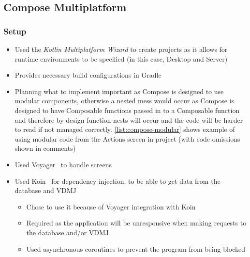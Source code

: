 \documentclass[../dissertation.tex]{subfiles}
\begin{document}
\subsection{Compose Multiplatform}
\subsubsection{Setup}
\begin{itemize}
  \item Used the \textit{Kotlin Multiplatform Wizard} to create projects as it allows
    for runtime environments to be specified (in this case, Desktop and Server)
  \item Provides necessary build configurations in Gradle
  \item Planning what to implement important as Compose is designed to use modular
    components, otherwise a nested mess would occur as Compose is designed to have
    Composable functions passed in to a Composable function and therefore by design
    function nests will occur and the code will be harder to read if not managed correctly.
    \autoref{list:compose-modular} shows example of using modular code
    from the Actions screen in project (with code omissions shown in comments)
  \item Used Voyager~\cite{voyager} to handle screens
  \item Used Koin~\cite{koin} for dependency injection, to be able to get data from the
    database and VDMJ
    \begin{itemize}
      \item Chose to use it because of Voyager integration with Koin~\cite{voyager:koin}
      \item Required as the application will be unresponsive when making requests
        to the database and/or VDMJ
      \item Used asynchronous coroutines to prevent the program from being blocked
    \end{itemize}
\end{itemize}

\end{document}
